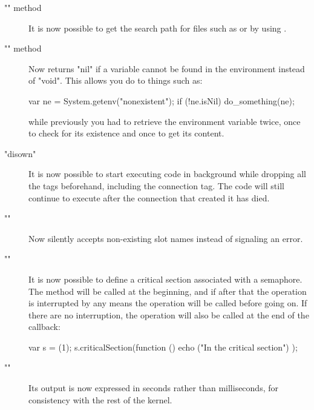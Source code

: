 \begin{description}
\item["" method]

  It is now possible to get the search path for files such as 
  or  by using .

\item["" method]

  Now returns "nil" if a variable cannot be found in the environment instead
  of "void". This allows you do to things such as:

\begin{urbiscript}
var ne = System.getenv("nonexistent");
if (!ne.isNil) do_something(ne);
\end{urbiscript}

  \noindent
  while previously you had to retrieve the environment variable twice, once
  to check for its existence and once to get its content.

\item["disown"]

  It is now possible to start executing code in background while dropping
  all the tags beforehand, including the connection tag. The code will still
  continue to execute after the connection that created it has died.

\item[""]

  Now silently accepts non-existing slot names instead of signaling an
  error.

\item[""]

  It is now possible to define a critical section associated with a
  semaphore. The  method will be called at the
  beginning, and if after that the operation is interrupted by any means the
   operation will be called before going on. If
  there are no interruption, the  operation will
  also be called at the end of the callback:

\begin{urbiunchecked}
var s = (1);
s.criticalSection(function () { echo ("In the critical section") });
\end{urbiunchecked}

\item[""]
  Its output is now expressed in seconds rather than milliseconds, for
  consistency with the rest of the kernel.
\end{description}

